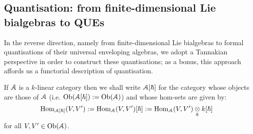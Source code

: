         \subsection{Quantisation: from finite-dimensional Lie bialgebras to QUEs}
            In the reverse direction, namely from finite-dimensional Lie bialgebras to formal quantisations of their universal enveloping algebras, we adopt a Tannakian perspective in order to construct these quantisations; as a bonus, this approach affords us a functorial description of quantisation. 
            
            \begin{convention}
                If $\mathcal{A}$ is a $k$-linear category then we shall write $\mathcal{A}[\hbar]$ for the category whose objects are those of $\mathcal{A}$ (i.e. $\mathrm{Ob}(\mathcal{A}[\hbar]) := \mathrm{Ob}(\mathcal{A})$) and whose hom-sets are given by:
                    $$\Hom_{\calA[\hbar]}(V, V') := \Hom_{\calA}(V, V')[\hbar] := \Hom_{\calA}(V, V') \tensor_k k[\hbar]$$
                for all $V, V' \in \mathrm{Ob}(\mathcal{A})$.
            \end{convention}
            
